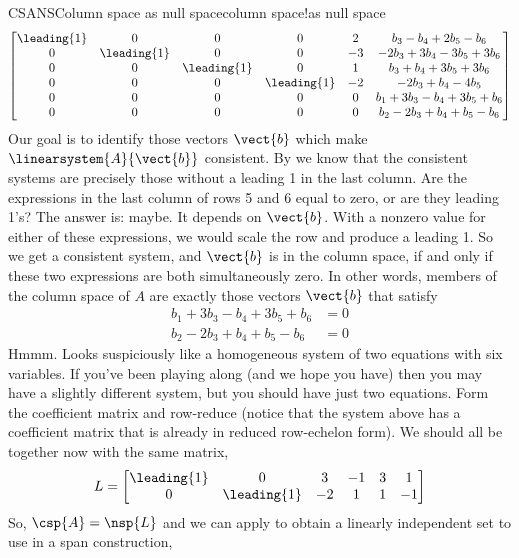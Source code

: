 \begin{example}{CSANS}{Column space as null space}{column space!as null space}
%
\begin{align*}
\begin{bmatrix}
 \leading{1} & 0 & 0 & 0 & 2 & b_3 - b_4 + 2 b_5 - b_6\\
 0 & \leading{1} & 0 & 0 & -3 & -2 b_3 + 3 b_4 - 3 b_5 + 3 b_6\\
 0 & 0 & \leading{1} & 0 & 1 & b_3 + b_4 + 3 b_5 + 3 b_6\\
 0 & 0 & 0 & \leading{1} & -2 & -2 b_3 + b_4 - 4 b_5\\
 0 & 0 & 0 & 0 & 0 & b_1 + 3 b_3 - b_4 + 3 b_5 + b_6\\
 0 & 0 & 0 & 0 & 0 & b_2 - 2 b_3 + b_4 + b_5 - b_6
\end{bmatrix}
\end{align*}
%
Our goal is to identify those vectors $\vect{b}$ which make $\linearsystem{A}{\vect{b}}$ consistent.  By  we know that the consistent systems are precisely those without a leading 1 in the last column.  Are the expressions in the last column of rows 5 and 6 equal to zero, or are they leading 1's?  The answer is: maybe.  It depends on $\vect{b}$.  With a nonzero value for either of these expressions, we would scale the row and produce a leading 1.   So we get a consistent system, and $\vect{b}$ is in the column space, if and only if these two expressions are both simultaneously zero.  In other words, members of the column space of $A$ are exactly those vectors $\vect{b}$ that satisfy
%
\begin{align*}
b_1 + 3 b_3 - b_4 + 3 b_5 + b_6 & = 0\\
b_2 - 2 b_3 + b_4 + b_5 - b_6 & = 0
\end{align*}
%
Hmmm.  Looks suspiciously like a homogeneous system of two equations with six variables.  If you've been playing along (and we hope you have) then you may have a slightly different system, but you should have just two equations.  Form the coefficient matrix and row-reduce (notice that the system above has a coefficient matrix that is already in reduced row-echelon form).  We should all be together now with the same matrix,
%
\begin{equation*}
L=
\begin{bmatrix}
 \leading{1} & 0 & 3 & -1 & 3 & 1 \\
 0 & \leading{1} & -2 & 1 & 1 & -1
\end{bmatrix}
\end{equation*}
%
So, $\csp{A}=\nsp{L}$ and we can apply  to obtain a linearly independent set to use in a span construction,

\end{example}
